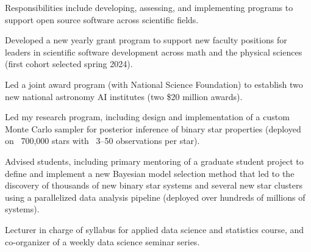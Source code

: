 \documentclass[letterpaper,12pt]{deedy-resume}
\begin{document}
\begin{minipage}[t]{0.64\textwidth}
\begin{tightitemize}
    \item Responsibilities include developing, assessing, and implementing programs to
    support open source software across scientific fields.
    \item Developed a new yearly grant program to support new faculty positions for
    leaders in scientific software development across math and the physical sciences
    (first cohort selected spring 2024).
    \item Led a joint award program (with National Science Foundation) to establish
    two new national astronomy AI institutes (two \$20 million awards).
\end{tightitemize}

\sectionspace %



\begin{tightitemize}
    \item Led my research program, including design and implementation of a custom Monte Carlo sampler for posterior inference of binary star properties (deployed on ~700,000 stars with ~3–50 observations per star).
    \item Advised students, including primary mentoring of a graduate student project to define and implement a new Bayesian model selection method that led to the discovery of thousands of new binary star systems and several new star clusters using a parallelized data analysis pipeline (deployed over hundreds of millions of systems).
    \item Lecturer in charge of syllabus for applied data science and statistics course, and co-organizer of a weekly data science seminar series.
\end{tightitemize}


\end{minipage}
\end{document}
